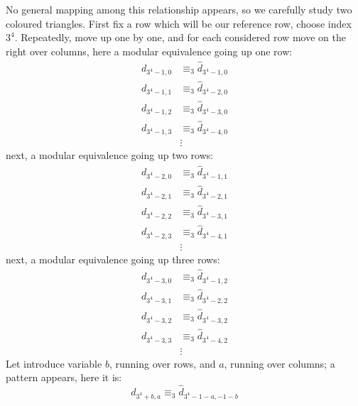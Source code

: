 \documentclass[10pt,a4paper]{article} %
\begin{document}
    No general mapping among this relationship appears, so we
    carefully study two coloured triangles.  First fix a row which
    will be our reference row, choose index $3^4$. Repeatedly, move up
    one by one, and for each considered row move on the right over
    columns, here a modular equivalence going up one row:
    \begin{displaymath}
        \begin{split}
            d_{3^4 -1,0} &\equiv_{3} \hat{d}_{3^4 -1,0} \\
            d_{3^4 -1,1} &\equiv_{3} \hat{d}_{3^4 -2,0} \\
            d_{3^4 -1,2} &\equiv_{3} \hat{d}_{3^4 -3,0} \\
            d_{3^4 -1,3} &\equiv_{3} \hat{d}_{3^4 -4,0} \\
            &\vdots
        \end{split}
    \end{displaymath}
    next, a modular equivalence going up two rows:
    \begin{displaymath}
        \begin{split}
            d_{3^4 -2,0} &\equiv_{3} \hat{d}_{3^4 -1,1} \\
            d_{3^4 -2,1} &\equiv_{3} \hat{d}_{3^4 -2,1} \\
            d_{3^4 -2,2} &\equiv_{3} \hat{d}_{3^4 -3,1} \\
            d_{3^4 -2,3} &\equiv_{3} \hat{d}_{3^4 -4,1} \\
            &\vdots
        \end{split}
    \end{displaymath}
    next, a modular equivalence going up three rows:
    \begin{displaymath}
        \begin{split}
            d_{3^4 -3,0} &\equiv_{3} \hat{d}_{3^4 -1,2} \\
            d_{3^4 -3,1} &\equiv_{3} \hat{d}_{3^4 -2,2} \\
            d_{3^4 -3,2} &\equiv_{3} \hat{d}_{3^4 -3,2} \\
            d_{3^4 -3,3} &\equiv_{3} \hat{d}_{3^4 -4,2} \\
            &\vdots
        \end{split}
    \end{displaymath}
    Let introduce variable $b$, running over rows, and $a$, running
    over columns; a pattern appears, here it is:
    \begin{displaymath}
            d_{3^4 +b,a} \equiv_{3} \hat{d}_{3^4 -1-a,-1-b} 
    \end{displaymath}
\end{document}
